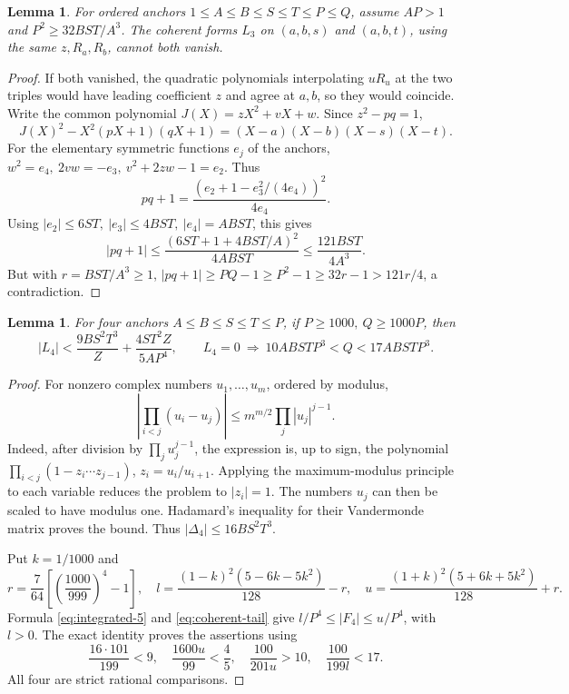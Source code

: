 \documentclass[12pt]{article}
\newtheorem{lemma}[theorem]{Lemma}
\numberwithin{equation}{section}
\begin{document}
\begin{lemma}\label{lem:four-anchor-nonvanishing}
For ordered anchors \(1\le A\le B\le S\le T\le P\le Q\), assume
\(AP>1\) and \(P^2\ge32BST/A^3\). The coherent forms \(L_3\) on
\((a,b,s)\) and \((a,b,t)\), using the same \(z,R_a,R_b\), cannot both vanish.
\end{lemma}
\begin{proof}
If both vanished, the quadratic polynomials interpolating \(uR_u\)
at the two triples would have leading coefficient \(z\) and agree at
\(a,b\), so they would coincide. Write the common polynomial
\(J(X)=zX^2+vX+w\). Since \(z^2-pq=1\),
\[
 J(X)^2-X^2(pX+1)(qX+1)=(X-a)(X-b)(X-s)(X-t).
\]
For the elementary symmetric functions \(e_j\) of the anchors,
\(w^2=e_4,\ 2vw=-e_3,\ v^2+2zw-1=e_2\). Thus
\[
 pq+1=\frac{(e_2+1-e_3^2/(4e_4))^2}{4e_4}.
\]
Using \(|e_2|\le6ST,\ |e_3|\le4BST,\ |e_4|=ABST\), this gives
\[
 |pq+1|\le\frac{(6ST+1+4BST/A)^2}{4ABST}
 \le\frac{121BST}{4A^3}.
\]
But with \(r=BST/A^3\ge1\),
\(|pq+1|\ge PQ-1\ge P^2-1\ge32r-1>121r/4\), a contradiction.
\end{proof}

\begin{lemma}\label{lem:direct-four}
For four anchors \(A\le B\le S\le T\le P\), if
\(P\ge1000,\ Q\ge1000P\), then
\[
 |L_4|<\frac{9BS^2T^3}{Z}+\frac{4ST^2Z}{5AP^4},\qquad
 L_4=0\ \Longrightarrow\ 10ABSTP^3<Q<17ABSTP^3.
\]
\end{lemma}
\begin{proof}
For nonzero complex numbers \(u_1,\ldots,u_m\), ordered by modulus,
\[
 \left|\prod_{i<j}(u_i-u_j)\right|
 \le m^{m/2}\prod_j|u_j|^{j-1}.
\]
Indeed, after division by \(\prod_j u_j^{j-1}\), the expression is,
up to sign, the polynomial
\(\prod_{i<j}(1-z_i\cdots z_{j-1})\), \(z_i=u_i/u_{i+1}\).
Applying the maximum-modulus principle to each variable reduces the
problem to \(|z_i|=1\). The numbers \(u_j\) can then be scaled to
have modulus one. Hadamard's inequality for their Vandermonde matrix
proves the bound.
Thus \(|\Delta_4|\le16BS^2T^3\).

Put \(k=1/1000\) and
\[
 r=\frac7{64}\left[\left(\frac{1000}{999}\right)^4-1\right],\quad
 l=\frac{(1-k)^2(5-6k-5k^2)}{128}-r,\quad
 u=\frac{(1+k)^2(5+6k+5k^2)}{128}+r.
\]
Formula \eqref{eq:integrated-5} and \eqref{eq:coherent-tail} give
\(l/P^4\le|F_4|\le u/P^4\), with \(l>0\).
The exact identity proves the assertions using
\[
 \frac{16\cdot101}{199}<9,\quad
 \frac{1600u}{99}<\frac45,\quad
 \frac{100}{201u}>10,\quad \frac{100}{199l}<17.
\]
All four are strict rational comparisons.
\end{proof}
\end{document}
